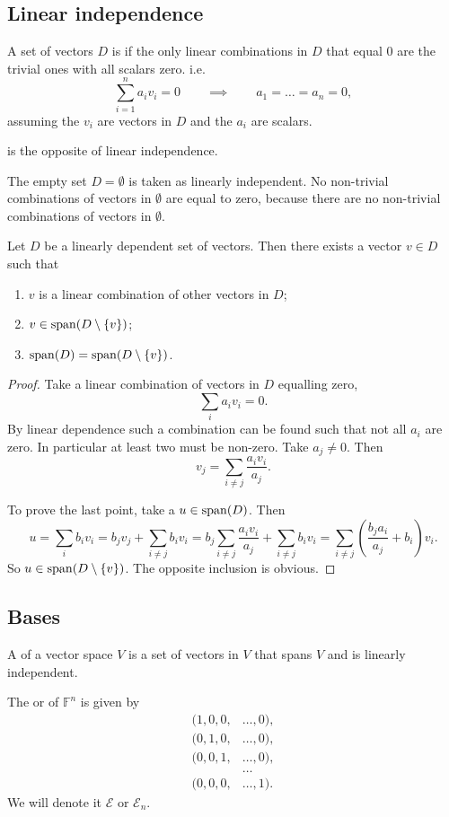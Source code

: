\subsection{Linear independence}
\begin{definition}
A set of vectors $D$ is  if the only linear combinations in $D$ that equal $0$ are the trivial ones with all scalars zero. i.e.\,
\[ \sum_{i=1}^n a_iv_i = 0 \qquad\implies\qquad a_1=\ldots=a_n = 0 , \]
assuming the $v_i$ are vectors in $D$ and the $a_i$ are scalars.

 is the opposite of linear independence.
\end{definition}
The empty set $D=\emptyset$ is taken as linearly independent. No non-trivial combinations of vectors in $\emptyset$ are equal to zero, because there are no non-trivial combinations of vectors in $\emptyset$.

\begin{lemma}
Let $D$ be a linearly dependent set of vectors. Then there exists a vector $v\in D$ such that
\begin{enumerate}
\item $v$ is a linear combination of other vectors in $D$;
\item $v\in \operatorname{span}(D\setminus\{v\})$;
\item $\operatorname{span}(D) = \operatorname{span}(D\setminus\{v\})$.
\end{enumerate}
\label{linearDependence}
\end{lemma}
\begin{proof}
Take a linear combination of vectors in $D$ equalling zero,
\[ \sum_i a_iv_i = 0. \]
By linear dependence such a combination can be found such that not all $a_i$ are zero. In particular at least two must be non-zero. Take $a_j\neq 0$. Then
\[ v_j = \sum_{i\neq j}\frac{a_iv_i}{a_j}. \]

To prove the last point, take a $u\in \operatorname{span}(D)$. Then
\[ u = \sum_i b_iv_i = b_j v_j + \sum_{i\neq j} b_iv_i = b_j\sum_{i\neq j}\frac{a_iv_i}{a_j} + \sum_{i\neq j} b_iv_i = \sum_{i\neq j}\left(\frac{b_ja_i}{a_j}+b_i\right)v_i.  \]
So $u\in \operatorname{span}(D\setminus\{v\})$. The opposite inclusion is obvious. 
\end{proof}

\subsection{Bases}
\begin{definition}
A  of a vector space $V$ is a set of vectors in $V$ that spans $V$ and is linearly independent.
\end{definition}
\begin{example}
The  or  of $\mathbb{F}^n$ is given by
\begin{align*}
(1,0,0,&\ldots,0), \\
(0,1,0,&\ldots,0), \\
(0,0,1,&\ldots,0), \\
&\ldots \\
(0,0,0,&\ldots,1).
\end{align*}
We will denote it $\mathcal{E}$ or $\mathcal{E}_n$.
\end{example}

